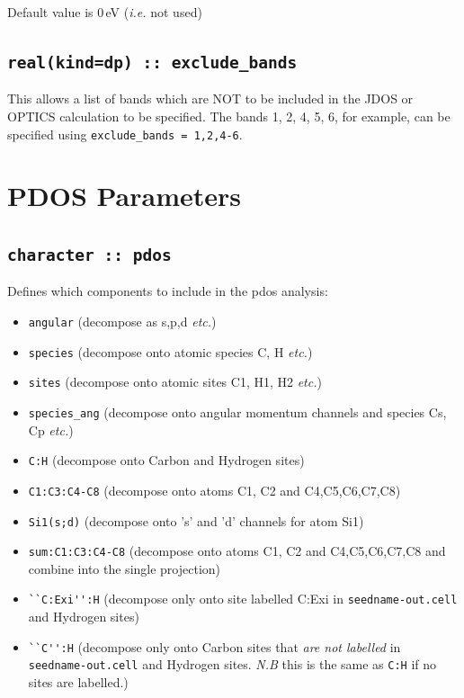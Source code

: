 \documentclass[a4paper,11pt,twoside]{book}
\begin{document}
{Default value is 0\,eV (\emph{i.e.} not used)

\subsection[exclude\_bands]{\tt real(kind=dp) :: exclude\_bands}
This allows a list of bands which are NOT to be included in the JDOS or OPTICS calculation to be specified.  The bands 1, 2, 4, 5, 6, for example, can be specified using \verb#exclude_bands = 1,2,4-6#.

\section{PDOS Parameters}

\subsection[pdos]{\tt character :: pdos}
Defines which components to include in the pdos analysis:

\begin{itemize}
\item[{\bf --}]  \verb#angular# (decompose as s,p,d \emph{etc.})
\item[{\bf --}]  \verb#species#    (decompose onto atomic species C, H \emph{etc.})
\item[{\bf --}]  \verb#sites#    (decompose onto atomic sites C1, H1, H2 \emph{etc.})
\item[{\bf --}]  \verb#species_ang#    (decompose onto angular momentum channels and species Cs, Cp \emph{etc.})
\item[{\bf --}]  \verb#C:H#     (decompose onto Carbon and Hydrogen sites)
\item[{\bf --}]  \verb#C1:C3:C4-C8#  (decompose onto atoms C1, C2 and C4,C5,C6,C7,C8)
\item[{\bf --}]  \verb#Si1(s;d)#     (decompose onto 's' and 'd' channels for
  atom Si1)
\item[{\bf --}]  \verb#sum:C1:C3:C4-C8#  (decompose onto atoms C1, C2 and C4,C5,C6,C7,C8 and combine into the single projection)
\item[{\bf --}]  \verb#``C:Exi'':H#  (decompose only onto site labelled C:Exi in \verb#seedname-out.cell# and Hydrogen sites)
\item[{\bf --}]  \verb#``C'':H#  (decompose only onto Carbon sites that \textit{are not labelled} in \verb#seedname-out.cell# and Hydrogen sites. \textit{N.B} this is the same as  \verb#C:H# if no sites are labelled.)



\end{itemize}}
\end{document}
